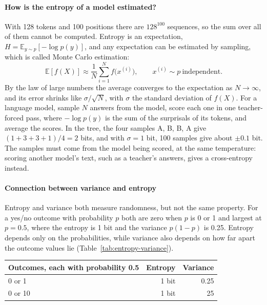 \paragraph{How is the entropy of a model estimated?}
With 128 tokens and 100 positions there are \(128^{100}\) sequences, so the sum over all of them cannot be computed.
Entropy is an expectation, \(H=\mathbb{E}_{y\sim p}[-\log p(y)]\), and any expectation can be estimated by sampling, which is called Monte Carlo estimation:
\[
\mathbb{E}[f(X)]\approx\frac{1}{N}\sum_{i=1}^{N} f\bigl(x^{(i)}\bigr),\qquad x^{(i)}\sim p\ \text{independent}.
\]
By the law of large numbers the average converges to the expectation as \(N\to\infty\), and its error shrinks like \(\sigma/\sqrt{N}\), with \(\sigma\) the standard deviation of \(f(X)\).
For a language model, sample \(N\) answers from the model, score each one in one teacher-forced pass, where \(-\log p(y)\) is the sum of the surprisals of its tokens, and average the scores.
In the tree, the four samples A, B, B, A give \((1+3+3+1)/4=2\) bits, and with \(\sigma=1\) bit, 100 samples give about \(\pm 0.1\) bit.
The samples must come from the model being scored, at the same temperature: scoring another model's text, such as a teacher's answers, gives a cross-entropy instead.

\paragraph{Connection between variance and entropy}
Entropy and variance both measure randomness, but not the same property.
For a yes/no outcome with probability \(p\) both are zero when \(p\) is 0 or 1 and largest at \(p=0.5\), where the entropy is 1 bit and the variance \(p(1-p)\) is 0.25.
Entropy depends only on the probabilities, while variance also depends on how far apart the outcome values lie (Table~\ref{tab:entropy-variance}).
\begin{center}
\label{tab:entropy-variance}
\begin{tabular}{lrr}
\hline
Outcomes, each with probability 0.5 & Entropy & Variance\\
\hline
0 or 1 & 1 bit & 0.25\\
0 or 10 & 1 bit & 25\\
\hline
\end{tabular}
\end{center}


